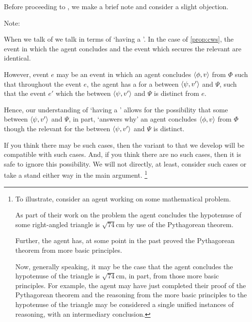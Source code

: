 \begin{note}
  Before proceeding to \supportII{}, we make a brief note and consider a slight objection.
\end{note}

\begin{note}
  Note:

  When we talk of  we talk in terms of `having a '.
  In the case of \autoref{prop:cws}, the event in which the agent concludes and the event which secures the relevant \wit{} are identical.

  However, event \(e\) may be an event in which an agent concludes \(\langle \phi, v \rangle\) from \(\Phi\) such that throughout the event \(e\), the agent has a \wit{} for a \ros{} between \(\langle \psi, v' \rangle\) and \(\Psi\), such that the event \(e'\) which  the \ros{} between \(\langle \psi, v' \rangle\) and \(\Psi\) is distinct from \(e\).

  Hence, our understanding of `having a ' allows for the possibility that some \ros{} between \(\langle \psi, v' \rangle\) and \(\Psi\), in part, `answers why' an agent concludes \(\langle \phi, v \rangle\) from \(\Phi\) though the relevant  for the \ros{} between \(\langle \psi, v' \rangle\) and \(\Psi\) is distinct.

  If you think there may be such cases, then the variant to \issueInclusion{} that we develop will be compatible with such cases.
  And, if you think there are no such cases, then it is safe to ignore this possibility.
  We will not directly, at least, consider such cases or take a stand either way in the main argument.%
  \footnote{
    To illustrate, consider an agent working on some mathematical problem.

    As part of their work on the problem the agent concludes the hypotenuse of some right-angled triangle is \(\sqrt{74}\text{cm}\) by use of the Pythagorean theorem.

    Further, the agent has, at some point in the past proved the Pythagorean theorem from more basic principles.

    Now, generally speaking, it may be the case that the agent concludes the hypotenuse of the triangle is \(\sqrt{74}\text{cm}\), in part, from those more basic principles.
    For example, the agent may have just completed their proof of the Pythagorean theorem and the reasoning from the more basic principles to the hypotenuse of the triangle may be considered a single unified instances of reasoning, with an intermediary conclusion.

}
\end{note}
